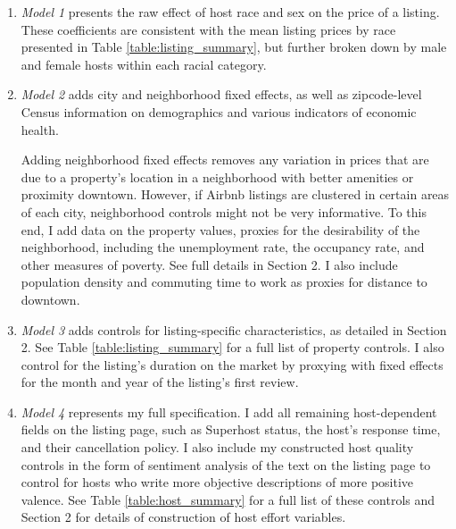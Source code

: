 \begin{enumerate}
	\item \textit{Model 1} presents the raw effect of host race and sex on the price of a listing. These coefficients are consistent with the mean listing prices by race presented in Table \ref{table:listing_summary}, but further broken down by male and female hosts within each racial category.
	
	\item \textit{Model 2} adds city and neighborhood fixed effects, as well as zipcode-level Census information on demographics and various indicators of economic health. 
	
	Adding neighborhood fixed effects removes any variation in prices that are due to a property's location in a neighborhood with better amenities or proximity downtown. However, if Airbnb listings are clustered in certain areas of each city, neighborhood controls might not be very informative. To this end, I add data on the property values, proxies for the desirability of the neighborhood, including the unemployment rate, the occupancy rate, and other measures of poverty. See full details in Section 2. I also include population density and commuting time to work as proxies for distance to downtown. 
		
	\item \textit{Model 3} adds controls for listing-specific characteristics, as detailed in Section 2. See Table \ref{table:listing_summary} for a full list of property controls. I also control for the listing's duration on the market by proxying with fixed effects for the month and year of the listing's first review.
	
	\item \textit{Model 4} represents my full specification. I add all remaining host-dependent fields on the listing page, such as Superhost status, the host's response time, and their cancellation policy. I also include my constructed host quality controls in the form of sentiment analysis of the text on the listing page to control for hosts who write more objective descriptions of more positive valence. See Table \ref{table:host_summary} for a full list of these controls and Section 2 for details of construction of host effort variables. 
\end{enumerate}




